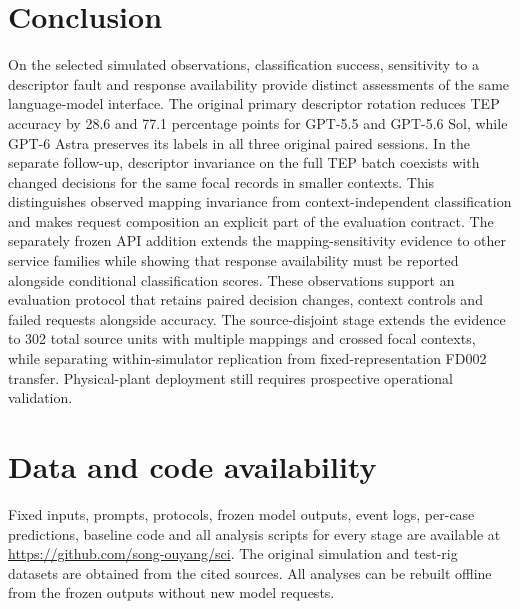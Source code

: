 \documentclass[11pt,a4paper]{article}
\begin{document}
\section{Conclusion}
On the selected simulated observations, classification success, sensitivity to a descriptor fault and response availability provide distinct assessments of the same language-model interface. The original primary descriptor rotation reduces TEP accuracy by 28.6 and 77.1 percentage points for GPT-5.5 and GPT-5.6 Sol, while GPT-6 Astra preserves its labels in all three original paired sessions. In the separate follow-up, descriptor invariance on the full TEP batch coexists with changed decisions for the same focal records in smaller contexts. This distinguishes observed mapping invariance from context-independent classification and makes request composition an explicit part of the evaluation contract. The separately frozen API addition extends the mapping-sensitivity evidence to other service families while showing that response availability must be reported alongside conditional classification scores. These observations support an evaluation protocol that retains paired decision changes, context controls and failed requests alongside accuracy. The source-disjoint stage extends the evidence to 302 total source units with multiple mappings and crossed focal contexts, while separating within-simulator replication from fixed-representation FD002 transfer. Physical-plant deployment still requires prospective operational validation.

\section*{Data and code availability}
Fixed inputs, prompts, protocols, frozen model outputs, event logs, per-case predictions, baseline code and all analysis scripts for every stage are available at \url{https://github.com/song-ouyang/sci}. The original simulation and test-rig datasets are obtained from the cited sources. All analyses can be rebuilt offline from the frozen outputs without new model requests.

\appendix
\end{document}
